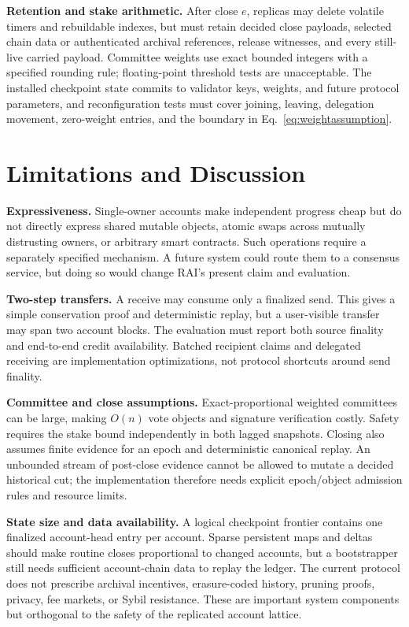 \documentclass[sigplan,review,anonymous]{acmart}
\newcommand{\sys}{\textsc{RAI}\xspace}
\newcommand{\paragraphhead}[1]{\smallskip\noindent\textbf{#1}}
\begin{document}
\paragraphhead{Retention and stake arithmetic.}
After close $e$, replicas may delete volatile timers and rebuildable indexes, but must retain decided close payloads, selected chain data or authenticated archival references, release witnesses, and every still-live carried payload.  Committee weights use exact bounded integers with a specified rounding rule; floating-point threshold tests are unacceptable.  The installed checkpoint state commits to validator keys, weights, and future protocol parameters, and reconfiguration tests must cover joining, leaving, delegation movement, zero-weight entries, and the boundary in Eq.~\eqref{eq:weightassumption}.

\section{Limitations and Discussion}
\label{sec:limits}

\paragraphhead{Expressiveness.}
Single-owner accounts make independent progress cheap but do not directly express shared mutable objects, atomic swaps across mutually distrusting owners, or arbitrary smart contracts.  Such operations require a separately specified mechanism.  A future system could route them to a consensus service, but doing so would change \sys's present claim and evaluation.

\paragraphhead{Two-step transfers.}
A receive may consume only a finalized send.  This gives a simple conservation proof and deterministic replay, but a user-visible transfer may span two account blocks.  The evaluation must report both source finality and end-to-end credit availability.  Batched recipient claims and delegated receiving are implementation optimizations, not protocol shortcuts around send finality.

\paragraphhead{Committee and close assumptions.}
Exact-proportional weighted committees can be large, making $O(n)$ vote objects and signature verification costly.  Safety requires the stake bound independently in both lagged snapshots.  Closing also assumes finite evidence for an epoch and deterministic canonical replay.  An unbounded stream of post-close evidence cannot be allowed to mutate a decided historical cut; the implementation therefore needs explicit epoch/object admission rules and resource limits.

\paragraphhead{State size and data availability.}
A logical checkpoint frontier contains one finalized account-head entry per account.  Sparse persistent maps and deltas should make routine closes proportional to changed accounts, but a bootstrapper still needs sufficient account-chain data to replay the ledger.  The current protocol does not prescribe archival incentives, erasure-coded history, pruning proofs, privacy, fee markets, or Sybil resistance.  These are important system components but orthogonal to the safety of the replicated account lattice.
\end{document}
